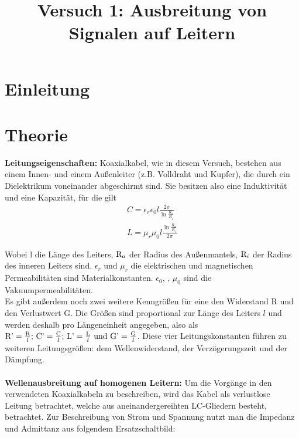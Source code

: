 

\title{Versuch 1: Ausbreitung von Signalen auf Leitern}


\maketitle
\tableofcontents
\disclaimer

\chapter{Einleitung}

\chapter{Theorie}
\textbf{Leitungseigenschaften:} Koaxialkabel, wie in diesem Versuch, bestehen aus einem Innen- und einem Außenleiter (z.B. Volldraht und Kupfer), die durch ein Dielektrikum voneinander abgeschirmt sind. Sie besitzen also eine Induktivität und eine Kapazität, für die gilt
\begin{align}
    C = \epsilon_r \epsilon_0 l \frac{2\pi}{\ln{\frac{R_a}{R_i}}} \\
    L = \mu_r \mu_0 l \frac{\ln{\frac{R_a}{R_i}}}{2\pi}
\end{align}

Wobei l die Länge des Leiters, $\text R_a$ der Radius des Außenmantels, $\text R_i$ der Radius des inneren Leiters sind. $ \epsilon_r \text{ und } \mu_r$ die elektrischen und magnetischen Permeabilitäten sind Materialkonstanten.
$\epsilon_0 \text{, } \text{, } \mu_0 $ sind die Vakuumpermeabilitäten. \\
Es gibt außerdem noch zwei weitere Kenngrößen für eine den Widerstand R und den Verlustwert G.
Die Größen sind proportional zur Länge des Leiters $l$ und werden deshalb pro Längeneinheit angegeben, also als $ \text {R'} = \frac {\text R}{l} \text{; } \text {C'} = \frac {\text C}{l} \text{; } \text {L'} = \frac {\text L}{l} \text{ und }\text {G'} = \frac {\text G}{l}$.
Diese vier Leitungskonstanten führen zu weiteren Leitungsgrößen: dem Wellenwiderstand, der Verzögerungszeit und der Dämpfung. \\ \\

\textbf{Wellenausbreitung auf homogenen Leitern:} Um die Vorgänge in den verwendeten Koaxialkabeln zu beschreiben, wird das Kabel als verlustlose Leitung betrachtet, welche aus aneinandergereihten LC-Gliedern besteht, betrachtet. Zur Beschreibung von Strom und Spannung nutzt man die Impedanz und Admittanz aus folgendem Ersatzschaltbild: \\

